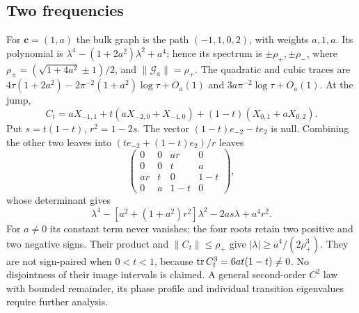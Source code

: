 \subsection{Two frequencies}
For $\mathbf c=(1,a)$ the bulk graph is the path $(-1,1,0,2)$,
with weights $a,1,a$. Its polynomial is
$\lambda^4-(1+2a^2)\lambda^2+a^4$; hence its spectrum is
$\pm\rho_+,\pm\rho_-$, where
$\rho_\pm=(\sqrt{1+4a^2}\pm1)/2$, and $\|\mathcal G_a\|=\rho_+$.
The quadratic and cubic traces are
$4\tau(1+2a^2)-2\pi^{-2}(1+a^2)\log\tau+O_a(1)$ and
$3a\pi^{-2}\log\tau+O_a(1)$.
At the jump,
\begin{equation}\label{mf:eq:two-harmonic-seam}
 C_t=aX_{-1,1}+t(aX_{-2,0}+X_{-1,0})
                   +(1-t)(X_{0,1}+aX_{0,2}).
\end{equation}
Put $s=t(1-t)$, $r^2=1-2s$. The vector $(1-t)e_{-2}-te_2$ is null.
Combining the other two leaves into $(te_{-2}+(1-t)e_2)/r$ leaves
\[
 \begin{pmatrix}0&0&ar&0\\0&0&t&a\\ar&t&0&1-t\\0&a&1-t&0\end{pmatrix},
\]
whose determinant gives
\begin{equation}\label{mf:eq:quartic}
 \lambda^4-[a^2+(1+a^2)r^2]\lambda^2-2as\lambda+a^4r^2.
\end{equation}
For $a\ne0$ its constant term never vanishes; the four roots retain two
positive and two negative signs. Their product and $\|C_t\|\le\rho_+$
give $|\lambda|\ge a^4/(2\rho_+^3)$. They are not sign-paired when
$0<t<1$, because $\operatorname{tr} C_t^3=6at(1-t)\ne0$.
No disjointness of their image intervals is claimed. A general
second-order $C^2$ law with bounded remainder, its phase profile and
individual transition eigenvalues require further analysis.
